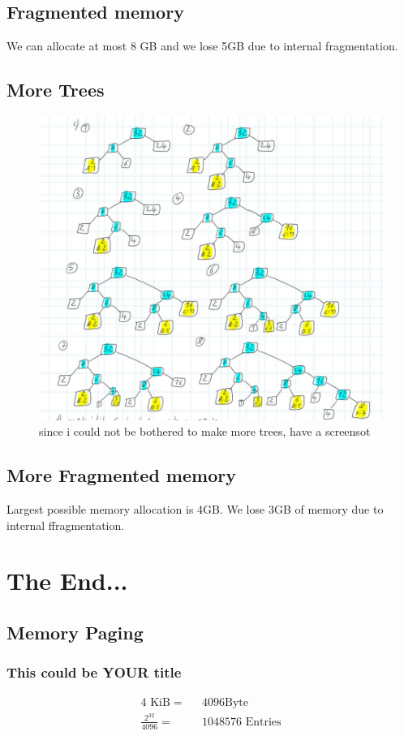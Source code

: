 \documentclass[a4paper, 11pt]{article}
\begin{document}
\subsection{Fragmented memory}
We can allocate at most 8 GB and we lose 5GB due to internal fragmentation.
\newpage\subsection{More Trees}
\begin{figure}[h]
  \includegraphics[scale=.7]{one_note_screen.png}
  \caption{since i could not be bothered to make more trees, have a screensot}
\end{figure}
\subsection{More Fragmented memory}
Largest possible memory allocation is 4GB. We lose 3GB of memory due to internal ffragmentation.
\newpage
\section{The End...}
\subsection{Memory Paging}
\subsubsection{This could be YOUR title}
\begin{align}
  4\mbox{ KiB} =&\mbox{ } 4096 \mbox{Byte}\\
  \frac{2^{32}}{4096} =&\mbox{ } 1048576 \mbox{ Entries}
\end{align}
\end{document}
